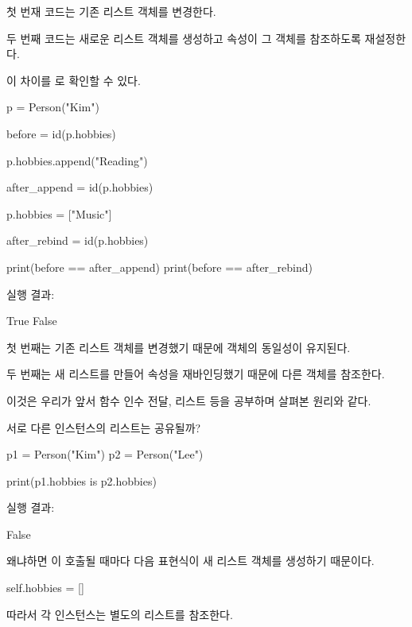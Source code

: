 첫 번재 코드는 기존 리스트 객체를 변경한다.

두 번째 코드는 새로운 리스트 객체를 생성하고  속성이 그 객체를 참조하도록 재설정한다.

이 차이를 로 확인할 수 있다.

\begin{dhkcode}
p = Person("Kim")

before = id(p.hobbies)

p.hobbies.append("Reading")

after_append = id(p.hobbies)

p.hobbies = ["Music"]

after_rebind = id(p.hobbies)

print(before == after_append)
print(before == after_rebind)
\end{dhkcode}

실행 결과:

\begin{dhkzsh}
True
False
\end{dhkzsh}

첫 번째는 기존 리스트 객체를 변경했기 때문에 객체의 동일성이 유지된다.

두 번째는 새 리스트를 만들어 속성을 재바인딩했기 때문에 다른 객체를 참조한다.

이것은 우리가 앞서 함수 인수 전달, 리스트 등을 공부하며 살펴본 원리와 같다.

\begin{dhknote}
\begin{dhksmry}[centered]
서로 다른 인스턴스의 리스트는 공유될까?
\end{dhksmry}
\end{dhknote}

\begin{dhkcode}
p1 = Person("Kim")
p2 = Person("Lee")

print(p1.hobbies is p2.hobbies)
\end{dhkcode}

실행 결과:

\begin{dhkzsh}
False
\end{dhkzsh}

왜냐하면 이 호출될 때마다 다음 표현식이 새 리스트 객체를 생성하기 때문이다.

\begin{dhkcode}
self.hobbies = []
\end{dhkcode}

따라서 각 인스턴스는 별도의 리스트를 참조한다.

